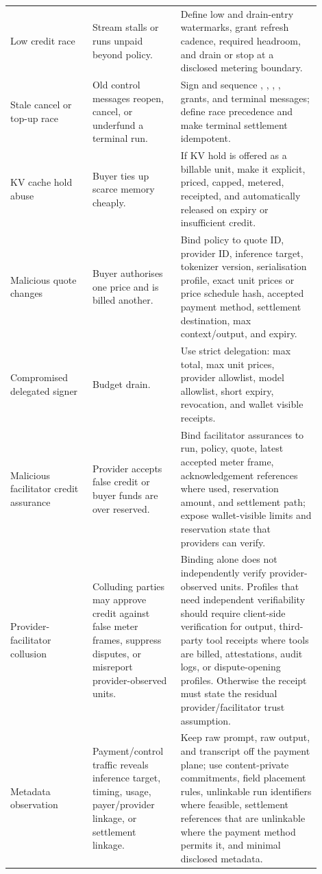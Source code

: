 \documentclass[11pt]{article}
\newcommand{\field}[1]{\texttt{\detokenize{#1}}}
\begin{document}
\begin{longtable}{>{\raggedright\arraybackslash}p{0.24\linewidth} >{\raggedright\arraybackslash}p{0.25\linewidth} >{\raggedright\arraybackslash}p{0.41\linewidth}}
Low credit race & Stream stalls or runs unpaid beyond policy. & Define low and drain-entry watermarks, grant refresh cadence, required headroom, and drain or stop at a disclosed metering boundary. \\
Stale cancel or top-up race & Old control messages reopen, cancel, or underfund a terminal run. & Sign and sequence \field{DeliveryAck}, \field{Resume}, \field{Cancel}, \field{Stop}, grants, and terminal messages; define race precedence and make terminal settlement idempotent. \\
KV cache hold abuse & Buyer ties up scarce memory cheaply. & If KV hold is offered as a billable unit, make it explicit, priced, capped, metered, receipted, and automatically released on expiry or insufficient credit. \\
Malicious quote changes & Buyer authorises one price and is billed another. & Bind policy to quote ID, provider ID, inference target, tokenizer version, serialisation profile, exact unit prices or price schedule hash, accepted payment method, settlement destination, max context/output, and expiry. \\
Compromised delegated signer & Budget drain. & Use strict delegation: max total, max unit prices, provider allowlist, model allowlist, short expiry, revocation, and wallet visible receipts. \\
Malicious facilitator credit assurance & Provider accepts false credit or buyer funds are over reserved. & Bind facilitator assurances to run, policy, quote, latest accepted meter frame, acknowledgement references where used, reservation amount, and settlement path; expose wallet-visible limits and reservation state that providers can verify. \\
Provider-facilitator collusion & Colluding parties may approve credit against false meter frames, suppress disputes, or misreport provider-observed units. & Binding alone does not independently verify provider-observed units. Profiles that need independent verifiability should require client-side \field{DeliveryAck} verification for output, third-party tool receipts where tools are billed, attestations, audit logs, or dispute-opening profiles. Otherwise the receipt must state the residual provider/facilitator trust assumption. \\
Metadata observation & Payment/control traffic reveals inference target, timing, usage, payer/provider linkage, or settlement linkage. & Keep raw prompt, raw output, and transcript off the payment plane; use content-private commitments, field placement rules, unlinkable run identifiers where feasible, settlement references that are unlinkable where the payment method permits it, and minimal disclosed metadata. \\

\end{longtable}
\end{document}
